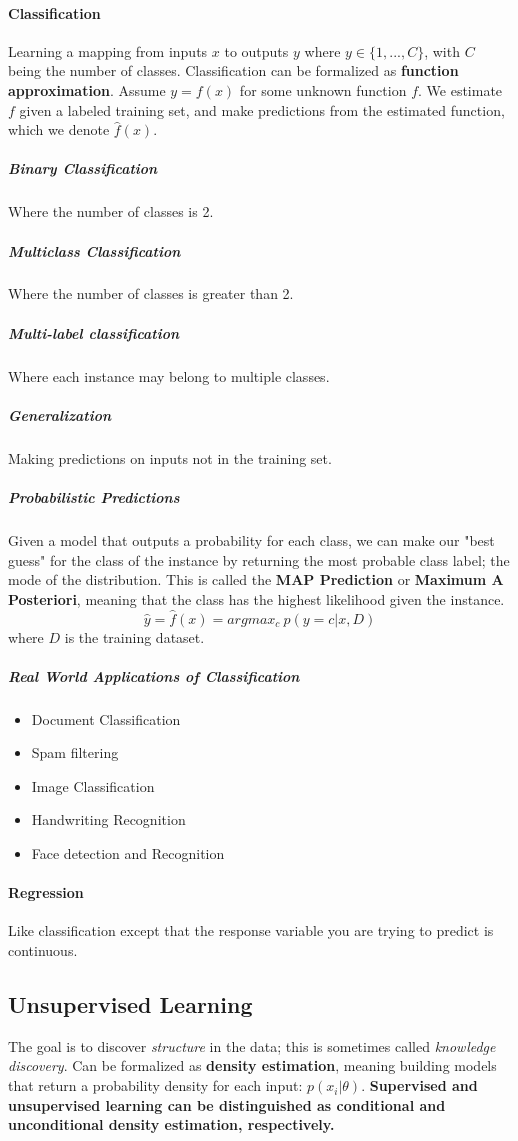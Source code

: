 \documentclass[11pt]{article}
\theoremstyle{definition}
\begin{document}
        \paragraph{Classification}
            Learning a mapping from inputs $x$ to outputs $y$ where $y\in \{1,..., C\}$, with $C$ being the number of classes.
            Classification can be formalized as \textbf{function approximation}.
            Assume $y=f(x)$ for some unknown function $f$. We estimate $f$ given a labeled training set, and make predictions from the estimated function, which we denote $\hat{f}(x)$.
            \subparagraph{Binary Classification}    
                Where the number of classes is 2.
            \subparagraph{Multiclass Classification}
                Where the number of classes is greater than 2.
            \subparagraph{Multi-label classification}
                Where each instance may belong to multiple classes.
            \subparagraph{Generalization}
                Making predictions on inputs not in the training set.
            \subparagraph{Probabilistic Predictions}
                Given a model that outputs a probability for each class, we can make our "best guess" for the class of the instance by returning the most probable class label; the mode of the distribution. This is called the \textbf{MAP Prediction} or \textbf{Maximum A Posteriori}, meaning that the class has the highest likelihood given the instance.
                \begin{equation}
                    \hat{y}=\hat{f}(x)=argmax_c\ p(y=c|x,D)
                \end{equation}
                where $D$ is the training dataset.
            \subparagraph{Real World Applications of Classification}
                \begin{itemize}
                    \item Document Classification
                    \item Spam filtering
                    \item Image Classification
                    \item Handwriting Recognition
                    \item Face detection and Recognition
                \end{itemize}
        \paragraph{Regression}
            Like classification except that the response variable you are trying to predict is continuous.
    \subsection{Unsupervised Learning}
        The goal is to discover \emph{structure} in the data; this is sometimes called \emph{knowledge discovery}.
        Can be formalized as \textbf{density estimation}, meaning building models that return a probability density for each input: $p(x_i|\theta)$.
        \textbf{Supervised and unsupervised learning can be distinguished as conditional and unconditional density estimation, respectively.}
\end{document}
